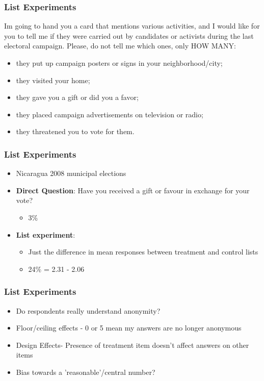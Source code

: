 \documentclass[xcolor=x11names,compress]{beamer}\usepackage[]{graphicx}\usepackage[]{color}
\renewcommand{\(}{\begin{columns}}
\renewcommand{\)}{\end{columns}}
\newcommand{\<}[1]{\begin{column}{#1}}
\renewcommand{\>}{\end{column}}
\begin{document}
\begin{frame}
\frametitle{List Experiments}
Im going to hand you a card that mentions various activities, and
I would like for you to tell me if they were carried out by candidates
or activists during the last electoral campaign. Please, do not tell
me which ones, only HOW MANY:

\begin{itemize}
\item they put up campaign posters or signs in your neighborhood/city;
\item they visited your home;
\item they gave you a gift or did you a favor;
\item they placed campaign advertisements on television or radio;
\item they threatened you to vote for them.
\end{itemize}
\end{frame}

\begin{frame}
\frametitle{List Experiments}
\begin{itemize}
\item Nicaragua 2008 municipal elections
\item \textbf{Direct Question}: Have you received a gift or favour in exchange for your vote?
\begin{itemize}
\item 3\%
\pause
\end{itemize}
\item \textbf{List experiment}:
\begin{itemize}
\item Just the difference in mean responses between treatment and control lists
\item 24\% = 2.31 - 2.06
\end{itemize}
\end{itemize}
\end{frame}

\begin{frame}
\frametitle{List Experiments}
\begin{itemize}
\item Do respondents really understand anonymity?
\pause
\item Floor/ceiling effects - 0 or 5 mean my answers are no longer anonymous
\pause
\item Design Effects- Presence of treatment item doesn't affect answers on other items
\pause
\item Bias towards a 'reasonable'/central number?
\end{itemize}
\end{frame}
\end{document}

